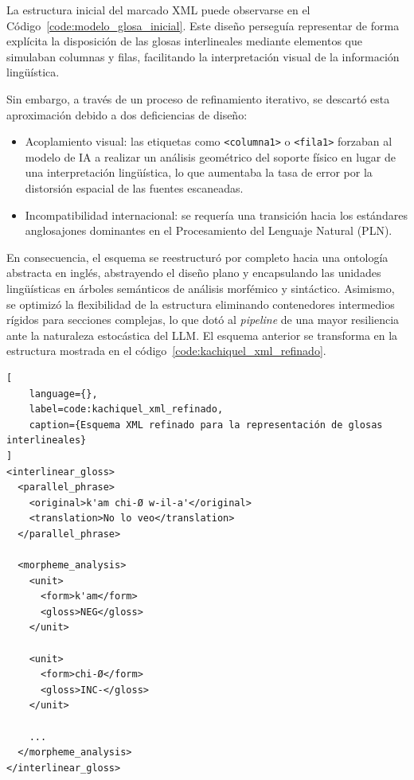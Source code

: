 La estructura inicial del marcado XML puede observarse en el Código~\ref{code:modelo_glosa_inicial}. Este diseño perseguía representar de forma explícita la disposición de las glosas interlineales mediante elementos que simulaban columnas y filas, facilitando la interpretación visual de la información lingüística.

Sin embargo, a través de un proceso de refinamiento iterativo, se descartó esta aproximación debido a dos deficiencias de diseño:

\begin{itemize}
    \item Acoplamiento visual: las etiquetas como \texttt{<columna1>} o \texttt{<fila1>} forzaban al modelo de IA a realizar un análisis geométrico del soporte físico en lugar de una interpretación lingüística, lo que aumentaba la tasa de error por la distorsión espacial de las fuentes escaneadas.

    \item Incompatibilidad internacional: se requería una transición hacia los estándares anglosajones dominantes en el Procesamiento del Lenguaje Natural (PLN).
\end{itemize}

En consecuencia, el esquema se reestructuró por completo hacia una ontología abstracta en inglés, abstrayendo el diseño plano y encapsulando las unidades lingüísticas en árboles semánticos de análisis morfémico y sintáctico. Asimismo, se optimizó la flexibilidad de la estructura eliminando contenedores intermedios rígidos para secciones complejas, lo que dotó al \textit{pipeline} de una mayor resiliencia ante la naturaleza estocástica del LLM. El esquema anterior se transforma en la estructura mostrada en el código~\ref{code:kachiquel_xml_refinado}.

\begin{lstlisting}[
    language={},
    label=code:kachiquel_xml_refinado,
    caption={Esquema XML refinado para la representación de glosas interlineales}
]
<interlinear_gloss>
  <parallel_phrase>
    <original>k'am chi-Ø w-il-a'</original>
    <translation>No lo veo</translation>
  </parallel_phrase>

  <morpheme_analysis>
    <unit>
      <form>k'am</form>
      <gloss>NEG</gloss>
    </unit>

    <unit>
      <form>chi-Ø</form>
      <gloss>INC-</gloss>
    </unit>

    ...
  </morpheme_analysis>
</interlinear_gloss>
\end{lstlisting}

